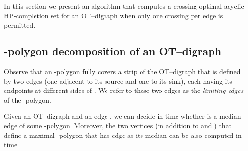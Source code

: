 \documentclass{myllncs-mixalis}
\begin{document}
In this section we present an algorithm that computes a
crossing-optimal acyclic HP-completion set  for an OT--digraph
when only one crossing per edge  is permitted.

\subsection{-polygon decomposition of an OT--digraph}

Observe that an -polygon fully covers a strip of the
OT--digraph that is defined by two edges (one adjacent to its
source and one to its sink), each having its endpoints at different
sides of . We refer to these two edges as the \emph{limiting
edges} of the -polygon.

\begin{lemma}
\label{lem:medianComputation} Given an OT--digraph  and an edge ,
we can decide in  time whether  is a median edge of some
-polygon. Moreover, the two vertices (in addition to 
and ) that define
 a maximal -polygon that has edge  as its median can be also computed in  time.
\end{lemma}
\end{document}
